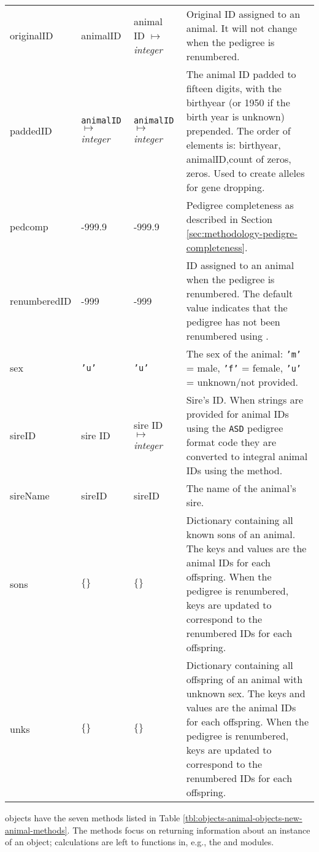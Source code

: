 \begin{center}
\begin{xtabular}{l|l|l|p{2.5in}}
        originalID & animalID & animal ID $\mapsto$ \emph{integer} & Original ID assigned to an animal. It will not change when the pedigree is renumbered. \\
        paddedID & \texttt{animalID} $\mapsto$ \emph{integer} & \texttt{animalID} $\mapsto$ \emph{integer} & The animal ID padded to fifteen digits, with the birthyear (or 1950 if the birth year is unknown) prepended.  The order of elements is: birthyear, animalID,count of zeros, zeros. Used to create alleles for gene dropping. \\
        pedcomp & -999.9 & -999.9 & Pedigree completeness as described in Section \ref{sec:methodology-pedigre-completeness}. \\
        renumberedID & -999 & -999 & ID assigned to an animal when the pedigree is renumbered. The default value indicates that the pedigree has not been renumbered using \PyPedal{}.\\
        sex & \texttt{'u'} & \texttt{'u'} & The sex of the animal: \texttt{'m'} = male, \texttt{'f'} = female, \texttt{'u'} = unknown/not provided. \\
        sireID & sire ID & sire ID $\mapsto$ \emph{integer} & Sire's ID. When strings are provided for animal  IDs using the \texttt{ASD} pedigree format code they are converted to integral animal IDs using the  method. \\
        sireName & sireID & sireID & The name of the animal's sire. \\
        sons & $\{\}$ & $\{\}$ & Dictionary containing all known sons of an animal. The keys and values are the animal IDs for each offspring. When the pedigree is renumbered, keys are updated to correspond to the renumbered IDs for each offspring.\\
        unks & $\{\}$ & $\{\}$ & Dictionary containing all offspring of an animal with unknown sex. The keys and values are the animal IDs for each offspring. When the pedigree is renumbered, keys are updated to correspond to the renumbered IDs for each offspring. \\
    \end{xtabular}
\end{center}
 objects have the seven methods listed in Table \ref{tbl:objects-animal-objects-new-animal-methods}. The methods focus on returning information about an instance of an object; calculations are left to functions in, e.g., the  and  modules. 
